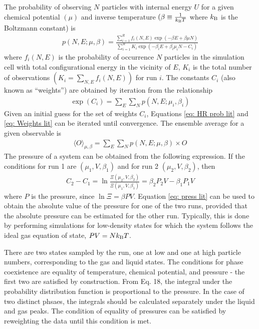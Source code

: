 \documentclass[journal=jced,manuscript=article]{achemso}
\begin{document}
The probability of observing $N$ particles with internal energy $U$ for a given chemical potential $(\mu)$ and inverse temperature $(\beta \equiv \frac{1}{k_{\rm B}T}$ where $k_{\rm B}$ is the Boltzmann constant) is
\begin{eqnarray} \label{eq: HR prob lit}
p(N,E;\mu,\beta) = \frac{\sum_{i=1}^{R} f_i(N,E)  \exp(-\beta E + \beta \mu N)}{\sum_{i=1}^{R} K_i \exp(-\beta_i E + \beta_i \mu_i N - C_i)}
\end{eqnarray}
where $f_i(N,E)$ is the probability of occurrence $N$ particles in the simulation cell with total configurational energy in the vicinity of $E$, $K_i$ is the total number of observations $(K_i = \sum_{N,E} f_i(N,E))$ for run $i$. The constants $C_i$ (also known as ``weights'') are obtained by iteration from the relationship
\begin{eqnarray} \label{eq: Weights lit}
\exp (C_i) = \sum_{E} \sum_{N} p(N,E;\mu_i,\beta_i)
\end{eqnarray}
Given an initial guess for the set of weights $C_i$, Equations \ref{eq: HR prob lit} and \ref{eq: Weights lit} can be iterated until convergence. The ensemble average for a given observable is
\begin{eqnarray}
\langle O \rangle_{\mu,\beta} = \sum_{E} \sum_{N} p(N,E;\mu,\beta) \times O
\end{eqnarray}
The pressure of a system can be obtained from the following expression. If the conditions for run 1 are $(\mu_1, V, \beta_1)$ and for run 2 $(\mu_2, V, \beta_2)$, then
\begin{eqnarray} \label{eq: press lit}
C_2 - C_1 = \ln \frac{\Xi (\mu_2,V,\beta_2)}{\Xi (\mu_1,V,\beta_1)} = \beta_2 P_2 V - \beta_1 P_1 V
\end{eqnarray}
where $P$ is the pressure, since $\ln \Xi = \beta P V$. Equation \ref{eq: press lit} can be used to obtain the absolute value of the pressure for one of the two runs, provided that the absolute pressure can be estimated for the other run. Typically, this is done by performing simulations for low-density states for which the system follows the ideal gas equation of state, $P V = N k_{\rm B} T$.

There are two states sampled by the run, one at low and one at high particle numbers, corresponding to the gas and liquid states. The conditions for phase coexistence are equality of temperature, chemical potential, and pressure - the first two are satisfied by construction. From Eq. 18, the integral under the probability distribution function is proportional to the pressure. In the case of two distinct phsaes, the integrals should be calculated separately under the liquid and gas peaks. The condition of equality of pressures can be satisfied by reweighting the data until this condition is met.
 
\end{document}
